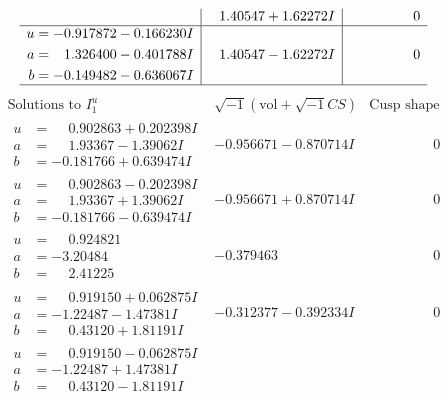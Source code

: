 \documentclass[1p]{elsarticle_modified}
\theoremstyle{definition}
\newcommand{\I}{\sqrt{-1}}
\begin{document}
$$\begin{array}{c|c|c}
 & \phantom{-}1.40547 + 1.62272 I & \phantom{-0.000000 } 0 \\ \hline\begin{aligned}
u &= -0.917872 - 0.166230 I \\
a &= \phantom{-}1.326400 - 0.401788 I \\
b &= -0.149482 - 0.636067 I\end{aligned}
 & \phantom{-}1.40547 - 1.62272 I & \phantom{-0.000000 } 0\\
 \hline 
 \end{array}$$\newpage$$\begin{array}{c|c|c}  
\text{Solutions to }I^u_{1}& \I (\text{vol} + \sqrt{-1}CS) & \text{Cusp shape}\\
 \hline 
\begin{aligned}
u &= \phantom{-}0.902863 + 0.202398 I \\
a &= \phantom{-}1.93367 - 1.39062 I \\
b &= -0.181766 + 0.639474 I\end{aligned}
 & -0.956671 - 0.870714 I & \phantom{-0.000000 } 0 \\ \hline\begin{aligned}
u &= \phantom{-}0.902863 - 0.202398 I \\
a &= \phantom{-}1.93367 + 1.39062 I \\
b &= -0.181766 - 0.639474 I\end{aligned}
 & -0.956671 + 0.870714 I & \phantom{-0.000000 } 0 \\ \hline\begin{aligned}
u &= \phantom{-}0.924821\phantom{ +0.000000I} \\
a &= -3.20484\phantom{ +0.000000I} \\
b &= \phantom{-}2.41225\phantom{ +0.000000I}\end{aligned}
 & -0.379463\phantom{ +0.000000I} & \phantom{-0.000000 } 0 \\ \hline\begin{aligned}
u &= \phantom{-}0.919150 + 0.062875 I \\
a &= -1.22487 - 1.47381 I \\
b &= \phantom{-}0.43120 + 1.81191 I\end{aligned}
 & -0.312377 - 0.392334 I & \phantom{-0.000000 } 0 \\ \hline\begin{aligned}
u &= \phantom{-}0.919150 - 0.062875 I \\
a &= -1.22487 + 1.47381 I \\
b &= \phantom{-}0.43120 - 1.81191 I\end{aligned}

\end{array}$$
\end{document}

